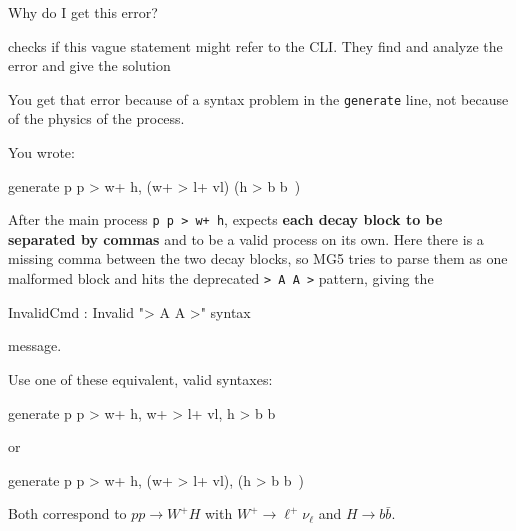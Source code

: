 \documentclass[submission, Phys]{SciPost}
\begin{document}
\begin{userblock}[User]
Why do I get this error?
\end{userblock}
%
\ma checks if this vague statement might refer to the CLI. They find and analyze the error and give the solution

\begin{promptblock}[\ma]
You get that error because of a syntax problem in the \texttt{generate} line, not because of the physics of the process.

You wrote:
\begin{bashblock}
generate p p > w+ h, (w+ > l+ vl) (h > b b~)
\end{bashblock}

After the main process \texttt{p p > w+ h}, \mg expects \textbf{each decay block to be separated by commas} and to be a valid process on its own. Here there is a missing comma between the two decay blocks, so MG5 tries to parse them as one malformed block and hits the deprecated \texttt{> A A >} pattern, giving the
\begin{bashblock}
InvalidCmd : Invalid "> A A >" syntax
\end{bashblock}
message.

Use one of these equivalent, valid syntaxes:
\begin{bashblock}
generate p p > w+ h, w+ > l+ vl, h > b b~
\end{bashblock}
or
\begin{bashblock}
generate p p > w+ h, (w+ > l+ vl), (h > b b~)
\end{bashblock}

Both correspond to $pp \to W^+ H$ with $W^+ \to \ell^+ \nu_\ell$ and $H \to b\bar b$.

\end{promptblock}
%
\end{document}
